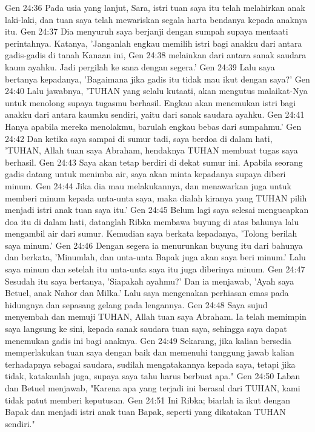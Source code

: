 Gen 24:36  Pada usia yang lanjut, Sara, istri tuan saya itu telah melahirkan anak laki-laki, dan tuan saya telah mewariskan segala harta bendanya kepada anaknya itu.
Gen 24:37  Dia menyuruh saya berjanji dengan sumpah supaya mentaati perintahnya. Katanya, 'Janganlah engkau memilih istri bagi anakku dari antara gadis-gadis di tanah Kanaan ini,
Gen 24:38  melainkan dari antara sanak saudara kaum ayahku. Jadi pergilah ke sana dengan segera.'
Gen 24:39  Lalu saya bertanya kepadanya, 'Bagaimana jika gadis itu tidak mau ikut dengan saya?'
Gen 24:40  Lalu jawabnya, 'TUHAN yang selalu kutaati, akan mengutus malaikat-Nya untuk menolong supaya tugasmu berhasil. Engkau akan menemukan istri bagi anakku dari antara kaumku sendiri, yaitu dari sanak saudara ayahku.
Gen 24:41  Hanya apabila mereka menolakmu, barulah engkau bebas dari sumpahmu.'
Gen 24:42  Dan ketika saya sampai di sumur tadi, saya berdoa di dalam hati, 'TUHAN, Allah tuan saya Abraham, hendaknya TUHAN membuat tugas saya berhasil.
Gen 24:43  Saya akan tetap berdiri di dekat sumur ini. Apabila seorang gadis datang untuk menimba air, saya akan minta kepadanya supaya diberi minum.
Gen 24:44  Jika dia mau melakukannya, dan menawarkan juga untuk memberi minum kepada unta-unta saya, maka dialah kiranya yang TUHAN pilih menjadi istri anak tuan saya itu.'
Gen 24:45  Belum lagi saya selesai mengucapkan doa itu di dalam hati, datanglah Ribka membawa buyung di atas bahunya lalu mengambil air dari sumur. Kemudian saya berkata kepadanya, 'Tolong berilah saya minum.'
Gen 24:46  Dengan segera ia menurunkan buyung itu dari bahunya dan berkata, 'Minumlah, dan unta-unta Bapak juga akan saya beri minum.' Lalu saya minum dan setelah itu unta-unta saya itu juga diberinya minum.
Gen 24:47  Sesudah itu saya bertanya, 'Siapakah ayahmu?' Dan ia menjawab, 'Ayah saya Betuel, anak Nahor dan Milka.' Lalu saya mengenakan perhiasan emas pada hidungnya dan sepasang gelang pada lengannya.
Gen 24:48  Saya sujud menyembah dan memuji TUHAN, Allah tuan saya Abraham. Ia telah memimpin saya langsung ke sini, kepada sanak saudara tuan saya, sehingga saya dapat menemukan gadis ini bagi anaknya.
Gen 24:49  Sekarang, jika kalian bersedia memperlakukan tuan saya dengan baik dan memenuhi tanggung jawab kalian terhadapnya sebagai saudara, sudilah mengatakannya kepada saya, tetapi jika tidak, katakanlah juga, supaya saya tahu harus berbuat apa."
Gen 24:50  Laban dan Betuel menjawab, "Karena apa yang terjadi ini berasal dari TUHAN, kami tidak patut memberi keputusan.
Gen 24:51  Ini Ribka; biarlah ia ikut dengan Bapak dan menjadi istri anak tuan Bapak, seperti yang dikatakan TUHAN sendiri."
